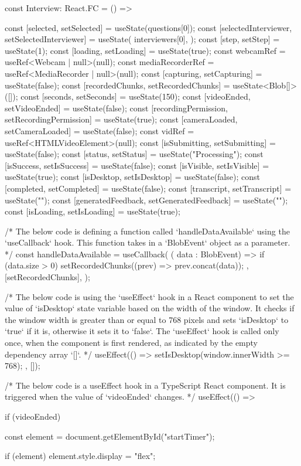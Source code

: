 const Interview: React.FC = () => {
  const [selected, setSelected] = useState(questions[0]);
  const [selectedInterviewer, setSelectedInterviewer] = useState(
    interviewers[0],
  );
  const [step, setStep] = useState(1);
  const [loading, setLoading] = useState(true);
  const webcamRef = useRef<Webcam | null>(null);
  const mediaRecorderRef = useRef<MediaRecorder | null>(null);
  const [capturing, setCapturing] = useState(false);
  const [recordedChunks, setRecordedChunks] = useState<Blob[]>([]);
  const [seconds, setSeconds] = useState(150);
  const [videoEnded, setVideoEnded] = useState(false);
  const [recordingPermission, setRecordingPermission] = useState(true);
  const [cameraLoaded, setCameraLoaded] = useState(false);
  const vidRef = useRef<HTMLVideoElement>(null);
  const [isSubmitting, setSubmitting] = useState(false);
  const [status, setStatus] = useState("Processing");
  const [isSuccess, setIsSuccess] = useState(false);
  const [isVisible, setIsVisible] = useState(true);
  const [isDesktop, setIsDesktop] = useState(false);
  const [completed, setCompleted] = useState(false);
  const [transcript, setTranscript] = useState("");
  const [generatedFeedback, setGeneratedFeedback] = useState("");
  const [isLoading, setIsLoading] = useState(true);

  /* The below code is defining a function called `handleDataAvailable` using the `useCallback` hook.
This function takes in a `BlobEvent` object as a parameter. */
  const handleDataAvailable = useCallback(
    ({ data }: BlobEvent) => {
      if (data.size > 0) {
        setRecordedChunks((prev) => prev.concat(data));
      }
    },
    [setRecordedChunks],
  );

  /* The below code is using the `useEffect` hook in a React component to set the value of `isDesktop`
state variable based on the width of the window. It checks if the window width is greater than or
equal to 768 pixels and sets `isDesktop` to `true` if it is, otherwise it sets it to `false`. The
`useEffect` hook is called only once, when the component is first rendered, as indicated by the
empty dependency array `[]`. */
  useEffect(() => {
    setIsDesktop(window.innerWidth >= 768);
  }, []);

  /* The below code is a useEffect hook in a TypeScript React component. It is triggered when the value
of `videoEnded` changes. */
  useEffect(() => {
    if (videoEnded) {
      const element = document.getElementById("startTimer");

      if (element) {
        element.style.display = "flex";
      }

}}}
